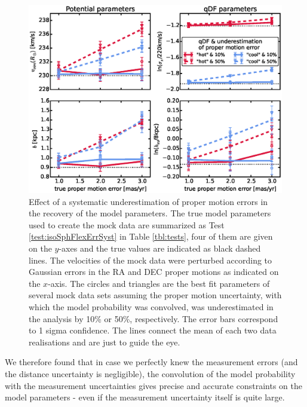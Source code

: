 \begin{figure}[!htbp]
\centering
\includegraphics[width=\columnwidth]{figs/isoSphFlexErrSyst_offset_vs_error.eps}
\caption{Effect of a systematic underestimation of proper motion errors in the recovery of the model parameters. The true model parameters used to create the mock data are summarized as Test \ref{test:isoSphFlexErrSyst} in Table \ref{tbl:tests}, four of them are given on the $y$-axes and the true values are indicated as black dashed lines. The velocities of the mock data were perturbed according to Gaussian errors in the RA and DEC proper motions as indicated on the $x$-axis. The circles and triangles are the best fit parameters of several mock data sets assuming the proper motion uncertainty, with which the model probability was convolved, was underestimated in the analysis by 10\% or 50\%, respectively. The error bars correspond to 1 sigma confidence. The lines connect the mean of each two data realisations and are just to guide the eye. }
\label{fig:isoSphFlexErrSyst}
\end{figure}


We therefore found that in case we perfectly knew the measurement errors (and the distance uncertainty is negligible), the convolution of the model probability with the measurement uncertainties gives precise and accurate constraints on the model parameters - even if the measurement uncertainty itself is quite large.


